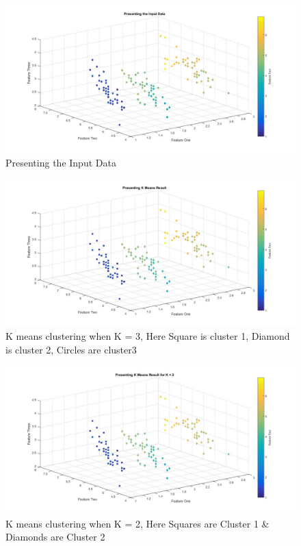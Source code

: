 \documentclass[10pt, letterpaper]{article}
\begin{document}
\begin{enumerate}
	\begin{figure}[h!]
	\centering
	\includegraphics[scale=0.45]{DataPresentation}
	\caption{Presenting the Input Data}
	\label{fig:ipdata}
	\end{figure}
	\begin{figure}[h!]
	\centering
	\includegraphics[scale=0.45]{PresentingKmeansResult}
	\caption{K means clustering when K = 3, Here Square is cluster 1, Diamond is cluster 2, Circles are cluster3}
	\label{fig:ClusterK3}
	\end{figure}
	\begin{figure}[h!]
	\centering
	\includegraphics[scale=0.45]{PresentingKmeansResultforK2}
	\caption{K means clustering when K = 2, Here Squares are Cluster 1 \& Diamonds are Cluster 2 }
	\label{fig:ClusterK2}
	\end{figure}



\end{enumerate}
\end{document}
